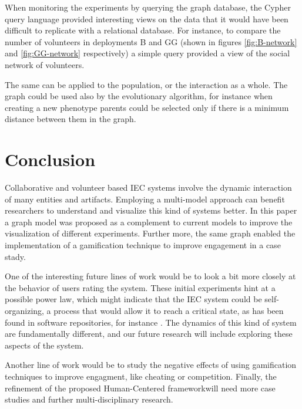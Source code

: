 \documentclass[conference]{IEEEtran}
\begin{document}
When monitoring the experiments by querying the graph database,  the Cypher query language 
provided interesting views on the data that it would have been
difficult to replicate with a relational database. 
For instance, to compare the number of volunteers in deployments
B and GG (shown in figures \ref{fig:B-network} and \ref{fig:GG-network} respectively)  a simple query
provided a view of the social network of volunteers. 

The same can be applied to 
the population, or the interaction as a whole. The graph could be used also by the evolutionary
algorithm, for instance when creating a new phenotype 
parents could be selected only if there is a minimum distance between them in the graph.

\section{Conclusion}
\label{sec:conclusions}


Collaborative and volunteer based IEC systems involve the dynamic 
interaction of many entities and artifacts. Employing a multi-model approach
can benefit researchers to understand and visualize this kind of systems better.
In this paper a graph model was proposed as a complement to current models to
improve the visualization of different experiments. Further more, the same graph enabled
the implementation of a gamification technique to improve engagement in
a case stady. 

One of the interesting future lines of work would be to look a bit
more closely at the behavior of users rating the system. These initial
experiments hint at a possible power law, which might indicate that
the IEC system could be self-organizing, a process that would allow it
to reach a critical state, as has been found in software repositories,
for instance \cite{Merelo2016:repomining}. The dynamics of this kind
of system are fundamentally different, and our future research will
include exploring these aspects of the system.

Another line of work would be to study the negative effects of using 
gamification techniques to improve engagment, like cheating or competition.
Finally, the refinement of the proposed Human-Centered frameworkwill need
more case studies and further multi-disciplinary research. 
\end{document}
